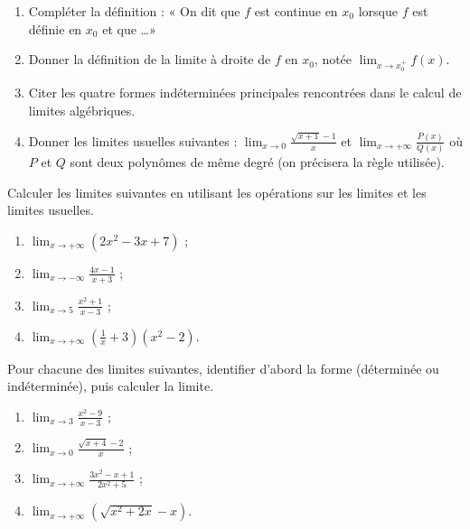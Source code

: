 \documentclass[11pt]{article}
\newcommand{\cle}[1]{{\popxbold\color{popdark}#1}}
\newcounter{popsec}
\newcounter{popsub}
\newcommand{\courssub}[1]{%
  \stepcounter{popsub}%
  \par\vspace{9pt}\noindent{\popxbold\fontsize{11.5}{13}\selectfont\color{popink}{\color{poporange}\thepopsec.\thepopsub}\hspace{6pt}#1}\par\nopagebreak\vspace{4pt}
}
\begin{document}
\begin{exercice}
\begin{enumerate}
\item Compléter la définition : « On dit que $f$ est \cle{continue} en $x_0$ lorsque $f$ est définie en $x_0$ et que \ldots »
\item Donner la définition de la limite à droite de $f$ en $x_0$, notée $\displaystyle\lim_{x\to x_0^+}f(x)$.
\item Citer les quatre formes indéterminées principales rencontrées dans le calcul de limites algébriques.
\item Donner les limites usuelles suivantes : $\displaystyle\lim_{x\to 0}\frac{\sqrt{x+1}-1}{x}$ et $\displaystyle\lim_{x\to +\infty}\frac{P(x)}{Q(x)}$ où $P$ et $Q$ sont deux polynômes de même degré (on précisera la règle utilisée).
\end{enumerate}
\end{exercice}

\begin{exercice}
Calculer les limites suivantes en utilisant les opérations sur les limites et les limites usuelles.
\begin{enumerate}
\item $\displaystyle\lim_{x\to +\infty}\left(2x^2-3x+7\right)$ ;
\item $\displaystyle\lim_{x\to -\infty}\frac{4x-1}{x+3}$ ;
\item $\displaystyle\lim_{x\to 5}\frac{x^2+1}{x-3}$ ;
\item $\displaystyle\lim_{x\to +\infty}\left(\frac{1}{x}+3\right)\left(x^2-2\right)$.
\end{enumerate}
\end{exercice}

\courssub{Je m'entraîne}

\begin{exercice}
Pour chacune des limites suivantes, identifier d'abord la forme (déterminée ou indéterminée), puis calculer la limite.
\begin{enumerate}
\item $\displaystyle\lim_{x\to 3}\frac{x^2-9}{x-3}$ ;
\item $\displaystyle\lim_{x\to 0}\frac{\sqrt{x+4}-2}{x}$ ;
\item $\displaystyle\lim_{x\to +\infty}\frac{3x^2-x+1}{2x^2+5}$ ;
\item $\displaystyle\lim_{x\to +\infty}\left(\sqrt{x^2+2x}-x\right)$.
\end{enumerate}
\end{exercice}
\end{document}
